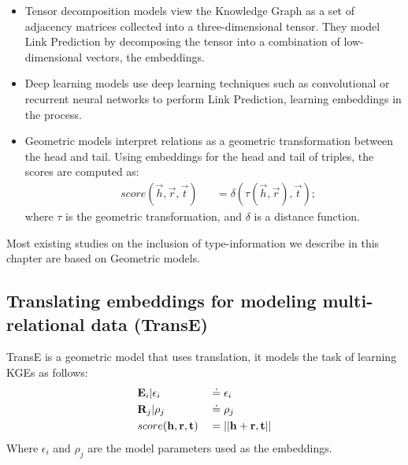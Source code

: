 \begin{itemize}
    \item Tensor decomposition models view the Knowledge Graph as a set of adjacency matrices collected into a three-dimensional tensor. They model Link Prediction by decomposing the tensor into a combination of low-dimensional vectors, the embeddings.
    \item Deep learning models use deep learning techniques such as convolutional or recurrent neural networks to perform Link Prediction, learning embeddings in the process.
    \item Geometric models interpret relations as a geometric transformation between the head and tail. Using embeddings for the head and tail of triples, the scores are computed as:
    \begin{align}
        & score(\vec{h}, \vec{r}, \vec{t}) && = \delta( \tau( \vec{h}, \vec{r}), \vec{t} );
    \end{align}
    where $\tau$ is the geometric transformation, and $\delta$ is a distance function.
\end{itemize}
%
Most existing studies on the inclusion of type-information we describe in this chapter are based on Geometric models.
\newpage


\subsection{Translating embeddings for modeling multi-relational data (TransE) \citep{bordes_translating_2013}}
TransE is a geometric model that uses translation, it models the task of learning KGEs as follows:
\begin{align}
    & \vec{E}_i | \epsilon_i && \simpnt \epsilon_i \\
%
    & \vec{R}_j | \rho_j && \simpnt \rho_j \\
%
    & score(\vec{h}, \vec{r}, \vec{t}) && = || \vec{h} + \vec{r}, \vec{t} ||
\end{align}
Where $\epsilon_i$ and $\rho_j$ are the model parameters used as the embeddings.

